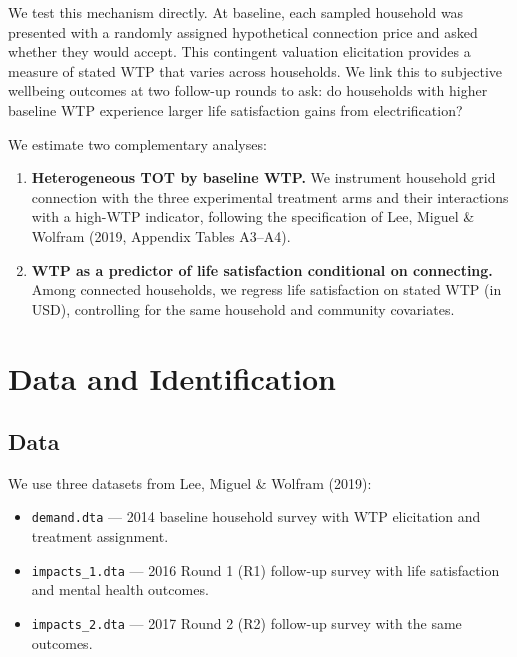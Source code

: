 \documentclass[letter,12pt]{article}
\begin{document}
We test this mechanism directly. At baseline, each sampled household was
presented with a randomly assigned hypothetical connection price and asked
whether they would accept. This contingent valuation elicitation provides a
measure of stated WTP that varies across households. We link this to
subjective wellbeing outcomes at two follow-up rounds to ask: do households
with higher baseline WTP experience larger life satisfaction gains from
electrification?

We estimate two complementary analyses:

\begin{enumerate}
  \item \textbf{Heterogeneous TOT by baseline WTP.} We instrument household
    grid connection with the three experimental treatment arms and their
    interactions with a high-WTP indicator, following the specification of
    Lee, Miguel \& Wolfram (2019, Appendix Tables A3--A4).

  \item \textbf{WTP as a predictor of life satisfaction conditional on
    connecting.} Among connected households, we regress life satisfaction
    on stated WTP (in USD), controlling for the same household and community
    covariates.
\end{enumerate}

\section{Data and Identification}

\subsection{Data}

We use three datasets from Lee, Miguel \& Wolfram (2019):

\begin{itemize}
  \item \texttt{demand.dta} --- 2014 baseline household survey with WTP
    elicitation and treatment assignment.
  \item \texttt{impacts\_1.dta} --- 2016 Round 1 (R1) follow-up survey with
    life satisfaction and mental health outcomes.
  \item \texttt{impacts\_2.dta} --- 2017 Round 2 (R2) follow-up survey with
    the same outcomes.
\end{itemize}
\end{document}
